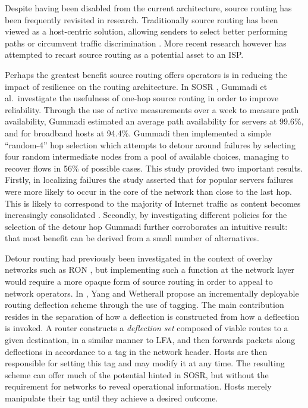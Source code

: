 Despite having been disabled from the current architecture, source routing has been frequently revisited in research.
Traditionally source routing has been viewed as a host-centric solution, allowing senders to select better performing paths or circumvent traffic discrimination \cite{Mahajan:2008p407,Dischinger:2010p157}.
More recent research however has attempted to recast source routing as a potential asset to an \ac{ISP}.

Perhaps the greatest benefit source routing offers operators is in reducing the impact of resilience on the routing architecture.
In \ac{SOSR} \cite{Gummadi:2004p131}, Gummadi et al.\ investigate the usefulness of one-hop source routing in order to improve reliability.
Through the use of active measurements over a week to measure path availability, Gummadi estimated an average path availability for servers at 99.6\%, and for broadband hosts at 94.4\%.
Gummadi then implemented a simple ``random-4'' hop selection which attempts to detour around failures by selecting four random intermediate nodes from a pool of available choices, managing to recover flows in 56\% of possible cases.
This study provided two important results.
Firstly, in localizing failures the study asserted that for popular servers failures were more likely to occur in the core of the network than close to the last hop.
This is likely to correspond to the majority of Internet traffic as content becomes increasingly consolidated \cite{Labovitz:2010p175}.
Secondly, by investigating different policies for the selection of the detour hop Gummadi further corroborates an intuitive result: that most benefit can be derived from a small number of alternatives.

Detour routing had previously been investigated in the context of overlay networks such as \ac{RON} \cite{Andersen:2002p530}, but implementing such a function at the network layer would require a more opaque form of source routing in order to appeal to network operators.
In \cite{Yang:2006p405}, Yang and Wetherall propose an incrementally deployable routing deflection scheme through the use of tagging.
The main contribution resides in the separation of how a deflection is constructed from how a deflection is invoked.
A router constructs a \emph{deflection set} composed of viable routes to a given destination, in a similar manner to \ac{LFA}, and then forwards packets along deflections in accordance to a tag in the network header.
Hosts are then responsible for setting this tag and may modify it at any time.
The resulting scheme can offer much of the potential hinted in \ac{SOSR}, but without the requirement for networks to reveal operational information.
Hosts merely manipulate their tag until they achieve a desired outcome.

